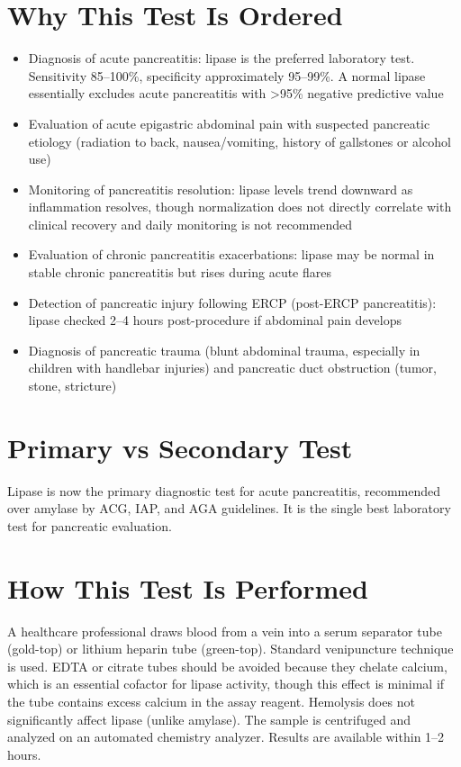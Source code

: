 \section*{Why This Test Is Ordered}
\begin{itemize}
  \item Diagnosis of acute pancreatitis: lipase is the preferred laboratory test. Sensitivity 85--100\%, specificity approximately 95--99\%. A normal lipase essentially excludes acute pancreatitis with >95\% negative predictive value \cite{vissers1999amylase}
  \item Evaluation of acute epigastric abdominal pain with suspected pancreatic etiology (radiation to back, nausea/vomiting, history of gallstones or alcohol use)
  \item Monitoring of pancreatitis resolution: lipase levels trend downward as inflammation resolves, though normalization does not directly correlate with clinical recovery and daily monitoring is not recommended
  \item Evaluation of chronic pancreatitis exacerbations: lipase may be normal in stable chronic pancreatitis but rises during acute flares
  \item Detection of pancreatic injury following ERCP (post-ERCP pancreatitis): lipase checked 2--4 hours post-procedure if abdominal pain develops
  \item Diagnosis of pancreatic trauma (blunt abdominal trauma, especially in children with handlebar injuries) and pancreatic duct obstruction (tumor, stone, stricture)
\end{itemize}

\section*{Primary vs Secondary Test}
Lipase is now the primary diagnostic test for acute pancreatitis, recommended over amylase by ACG, IAP, and AGA guidelines. It is the single best laboratory test for pancreatic evaluation.

\section*{How This Test Is Performed}
A healthcare professional draws blood from a vein into a serum separator tube (gold-top) or lithium heparin tube (green-top). Standard venipuncture technique is used. EDTA or citrate tubes should be avoided because they chelate calcium, which is an essential cofactor for lipase activity, though this effect is minimal if the tube contains excess calcium in the assay reagent. Hemolysis does not significantly affect lipase (unlike amylase). The sample is centrifuged and analyzed on an automated chemistry analyzer. Results are available within 1--2 hours.


